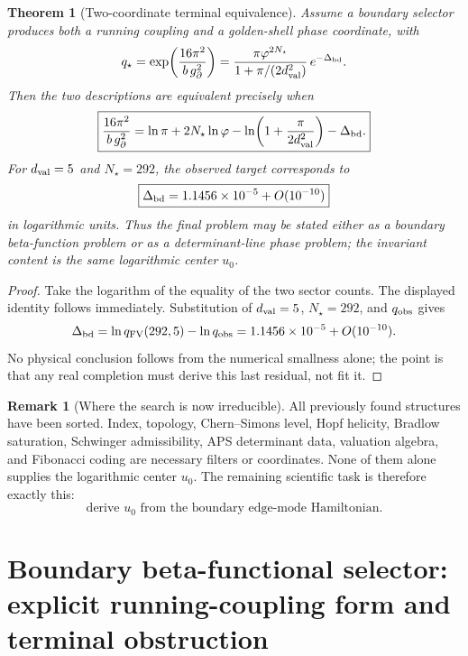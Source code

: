 \documentclass[aps,prd,reprint,nofootinbib,superscriptaddress,floatfix]{revtex4-2}
\numberwithin{equation}{section}
\theoremstyle{definition}
\newtheorem{remark}{Remark}[section]
\theoremstyle{plain}
\newtheorem{theorem}{Theorem}[section]
\begin{document}
\begin{theorem}[Two-coordinate terminal equivalence]
Assume a boundary selector produces both a running coupling and a
golden-shell phase coordinate, with
\[
q_\star
=
\exp\!\left(\frac{16\pi^2}{b\,g_\partial^2}\right)
=
\frac{\pi\varphi^{2N_\star}}{1+\pi/(2d_{\rm val}^2)}
\,e^{-\Delta_{\rm bd}} .
\]
Then the two descriptions are equivalent precisely when
\begin{equation}
\boxed{
\frac{16\pi^2}{b\,g_\partial^2}
=
\ln\pi+2N_\star\ln\varphi
-\ln\!\left(1+\frac{\pi}{2d_{\rm val}^2}\right)
-\Delta_{\rm bd}.
}
\end{equation}
For \(d_{\rm val}=5\) and \(N_\star=292\), the observed target corresponds
to
\[
\boxed{
\Delta_{\rm bd}=1.1456\times10^{-5}+O(10^{-10})
}
\]
in logarithmic units.  Thus the final problem may be stated either as a
boundary beta-function problem or as a determinant-line phase problem;
the invariant content is the same logarithmic center \(u_0\).
\end{theorem}

\begin{proof}
Take the logarithm of the equality of the two sector counts.  The
displayed identity follows immediately.  Substitution of \(d_{\rm val}=5\),
\(N_\star=292\), and \(q_{\rm obs}\) gives
\[
\Delta_{\rm bd}
=
\ln q_{\rm FV}(292,5)-\ln q_{\rm obs}
=
1.1456\times10^{-5}+O(10^{-10}).
\]
No physical conclusion follows from the numerical smallness alone; the
point is that any real completion must derive this last residual, not fit
it.
\end{proof}

\begin{remark}[Where the search is now irreducible]
All previously found structures have been sorted.  Index, topology,
Chern--Simons level, Hopf helicity, Bradlow saturation, Schwinger
admissibility, APS determinant data, valuation algebra, and Fibonacci
coding are necessary filters or coordinates.  None of them alone supplies
the logarithmic center \(u_0\).  The remaining scientific task is therefore
exactly this:
\[
\boxed{
\text{derive }u_0
\text{ from the boundary edge-mode Hamiltonian.}
}
\]
\end{remark}


\section{Boundary beta-functional selector: explicit running-coupling form and terminal obstruction}
\end{document}
